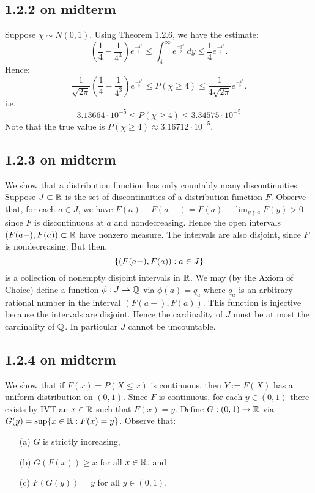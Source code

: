 \documentclass[11pt]{article}
\begin{document}
\subsection*{1.2.2 on midterm}

Suppose $\chi \sim N(0,1)$. Using Theorem 1.2.6, we have the estimate: \[\left(\frac{1}{4} - \frac{1}{4^3}\right)e^{\frac{-4^2}{2}} \leq \int_4^\infty e^{\frac{-y^2}{2}} \,dy \leq \frac{1}{4}e^{\frac{-4^2}{2}}.\] Hence: \[\frac{1}{\sqrt{2\pi}}\left(\frac{1}{4} - \frac{1}{4^3}\right)e^{\frac{-4^2}{2}}\leq P(\chi \geq 4) \leq \frac{1}{4\sqrt{2\pi}}e^{\frac{-4^2}{2}}.\] i.e. \[3.13664 \cdot 10^{-5}\leq P(\chi \geq 4) \leq 3.34575 \cdot 10^{-5}\] Note that the true value is $P(\chi \geq 4) \approx 3.16712 \cdot 10^{-5}$.

\subsection*{1.2.3 on midterm}

We show that a distribution function has only countably many discontinuities. Suppose $J \subset {\mathbb R}$ is the set of discontinuities of a distribution function $F$. Observe that, for each $a \in J$, we have $F(a) - F(a-) = F(a) - \lim_{y\uparrow a} F(y) > 0$ since $F$ is discontinuous at $a$ and nondecreasing. Hence the open intervals $(F(a-), F(a)) \subset {\mathbb R}$ have nonzero measure. The intervals are also disjoint, since $F$ is nondecreasing. But then, \[\{(F(a-), F(a)) : a \in J\}\] is a collection of nonempty disjoint intervals in ${\mathbb R}$. We may (by the Axiom of Choice) define a function $\phi: J \to {\mathbb Q}$ via $\phi(a) = q_a$ where $q_a$ is an arbitrary rational number in the interval $(F(a-), F(a))$. This function is injective because the intervals are disjoint. Hence the cardinality of $J$ must be at most the cardinality of ${\mathbb Q}$. In particular $J$ cannot be uncountable.

\subsection*{1.2.4 on midterm}

We show that if $F(x) = P(X\leq x)$ is continuous, then $Y := F(X)$ has a uniform distribution on $(0,1)$. Since $F$ is continuous, for each $y \in (0,1)$ there exists by IVT an $x \in {\mathbb R}$ such that $F(x) = y$. Define $G:(0,1) \to {\mathbb R}$ via $G(y) = \sup \{x \in {\mathbb R} : F(x) = y\}$. Observe that: \begin{enumerate}
    \item[(a)] $G$ is strictly increasing, 
    \item[(b)] $G(F(x)) \geq x$ for all $x \in {\mathbb R}$, and 
    \item[(c)] $F(G(y)) = y$ for all $y \in (0,1)$. \end{enumerate}
    
\end{document}
